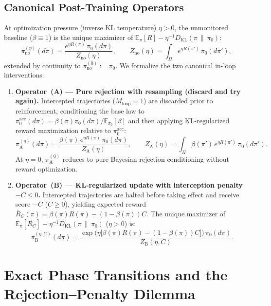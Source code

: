 \documentclass[11pt,a4paper]{article}
\newcommand{\E}{\mathbb{E}}
\newcommand{\DKL}{D_{\mathrm{KL}}}
\begin{document}
\subsection{Canonical Post-Training Operators}
At optimization pressure (inverse KL temperature) $\eta > 0$, the unmonitored baseline ($\beta \equiv 1$) is the unique maximizer of $\E_{\pi}[R] - \eta^{-1}\DKL(\pi \,\|\, \pi_0)$:
\begin{equation}
  \pi_{\mathrm{no}}^{(\eta)}(d\pi) = \frac{e^{\eta R(\pi)}\,\pi_0(d\pi)}{Z_{\mathrm{no}}(\eta)},
  \qquad Z_{\mathrm{no}}(\eta) = \int_{\Pi} e^{\eta R(\pi')}\,\pi_0(d\pi'),
\end{equation}
extended by continuity to $\pi_{\mathrm{no}}^{(0)} := \pi_0$. We formalize the two canonical in-loop interventions:
\begin{enumerate}
  \item \textbf{Operator~(A) --- Pure rejection with resampling (discard and try again).} Intercepted trajectories ($M_{\mathrm{loop}} = 1$) are discarded prior to reinforcement, conditioning the base law to $\pi_0^{\mathrm{acc}}(d\pi) = \beta(\pi)\pi_0(d\pi)/\E_{\pi_0}[\beta]$ and then applying KL-regularized reward maximization relative to $\pi_0^{\mathrm{acc}}$:
  \begin{equation}
    \pi_{\mathrm{A}}^{(\eta)}(d\pi) = \frac{\beta(\pi)\,e^{\eta R(\pi)}\,\pi_0(d\pi)}{Z_{\mathrm{A}}(\eta)},
    \qquad Z_{\mathrm{A}}(\eta) = \int_{\Pi} \beta(\pi')\,e^{\eta R(\pi')}\,\pi_0(d\pi').
  \end{equation}
  At $\eta = 0$, $\pi_{\mathrm{A}}^{(0)}$ reduces to pure Bayesian rejection conditioning without reward optimization.
  \item \textbf{Operator~(B) --- KL-regularized update with interception penalty $-C \le 0$.} Intercepted trajectories are halted before taking effect and receive score $-C$ ($C \ge 0$), yielding expected reward $\bar{R}_C(\pi) = \beta(\pi)R(\pi) - (1-\beta(\pi))C$. The unique maximizer of $\E_{\pi}[\bar{R}_C] - \eta^{-1}\DKL(\pi \,\|\, \pi_0)$ ($\eta > 0$) is:
  \begin{equation}
    \pi_{\mathrm{B}}^{(\eta, C)}(d\pi) = \frac{\exp\!\big(\eta\big[\beta(\pi)R(\pi) - (1-\beta(\pi))C\big]\big)\,\pi_0(d\pi)}{Z_{\mathrm{B}}(\eta, C)}.
  \end{equation}
\end{enumerate}

\section{Exact Phase Transitions and the Rejection--Penalty Dilemma}
\end{document}
